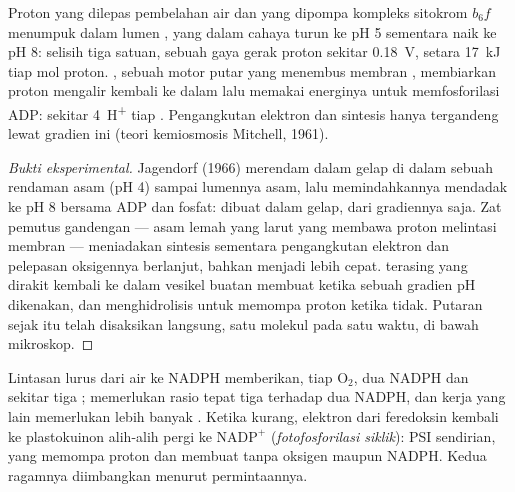 \begin{theorem}\label{thm:b1:photosynthesis:chemiosmosis}
Proton yang dilepas pembelahan air dan yang dipompa kompleks sitokrom
$b_6f$ menumpuk dalam lumen , yang dalam cahaya turun ke pH 5
sementara  naik ke pH 8: selisih tiga satuan, sebuah gaya gerak
proton sekitar \qty{0.18}{V}, setara \qty{17}{kJ} tiap mol proton.
\emph{}, sebuah motor putar yang menembus membran ,
membiarkan proton mengalir kembali ke dalam  lalu memakai
energinya untuk memfosforilasi ADP: sekitar \qty{4}{H^+} tiap .
Pengangkutan elektron dan sintesis  hanya tergandeng lewat gradien
ini (teori kemiosmosis Mitchell, 1961).
\end{theorem}
\begin{proof}[Bukti eksperimental]
Jagendorf (1966) merendam  dalam gelap di dalam sebuah rendaman
asam (pH 4) sampai lumennya asam, lalu memindahkannya mendadak ke pH 8
bersama ADP dan fosfat:  dibuat dalam gelap, dari gradiennya saja.
Zat pemutus gandengan --- asam lemah yang larut  yang membawa
proton melintasi membran --- meniadakan sintesis  sementara
pengangkutan elektron dan pelepasan oksigennya berlanjut, bahkan
menjadi lebih cepat.  terasing yang dirakit kembali ke dalam
vesikel buatan membuat  ketika sebuah gradien pH dikenakan, dan
menghidrolisis  untuk memompa proton ketika tidak. Putaran 
sejak itu telah disaksikan langsung, satu molekul pada satu waktu, di
bawah mikroskop.
\end{proof}

\begin{example}\label{ex:b1:photosynthesis:cyclic}
Lintasan lurus dari air ke NADPH memberikan, tiap $\mathrm{O_2}$, dua
NADPH dan sekitar tiga ;  memerlukan rasio tepat tiga 
terhadap dua NADPH, dan kerja  yang lain memerlukan lebih
banyak . Ketika  kurang, elektron dari feredoksin kembali ke
plastokuinon alih-alih pergi ke $\mathrm{NADP^+}$ (\emph{fotofosforilasi
siklik}): PSI sendirian, yang memompa proton dan membuat  tanpa
oksigen maupun NADPH. Kedua ragamnya diimbangkan menurut permintaannya.
\end{example}

